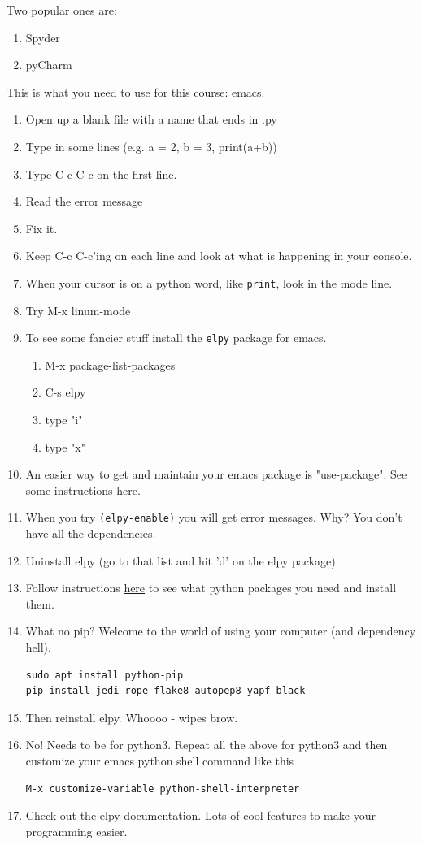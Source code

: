 \documentclass{article}
\begin{document}
Two popular ones are:
\begin{enumerate}
\item Spyder
\item pyCharm
\end{enumerate}

This is what you need to use for this course: emacs.
\begin{enumerate}
\item Open up a blank file with a name that ends in .py
\item Type in some lines (e.g. a = 2, b = 3, print(a+b))
\item Type C-c C-c on the first line.
\item Read the error message
\item Fix it.
\item Keep C-c C-c'ing on each line and look at what is happening in your console.
\item When your cursor is on a python word, like \texttt{print}, look in the mode line.
\item Try M-x linum-mode
\item To see some fancier stuff install the \texttt{elpy} package for emacs.
\begin{enumerate}
\item M-x package-list-packages
\item C-s elpy
\item type "i"
\item type "x"
\end{enumerate}
\item An easier way to get and maintain your emacs package is "use-package". See some instructions \href{https://elpy.readthedocs.io/en/latest/introduction.html\#overview}{here}.
\item When you try \texttt{(elpy-enable)} you will get error messages. Why? You don't have all the dependencies.
\item Uninstall elpy (go to that list and hit 'd' on the elpy package).
\item Follow instructions \href{https://github.com/jorgenschaefer/elpy}{here} to see what python packages you need and install them.
\item What no pip? Welcome to the world of using your computer (and dependency hell). 
\begin{verbatim}
sudo apt install python-pip
pip install jedi rope flake8 autopep8 yapf black
\end{verbatim}
\item Then reinstall elpy. Whoooo - wipes brow.
\item No! Needs to be for python3. Repeat all the above for python3 and then customize your emacs python shell command like this
\begin{verbatim}
M-x customize-variable python-shell-interpreter
\end{verbatim}
\item Check out the elpy \href{https://elpy.readthedocs.io/en/latest/introduction.html\#overview}{documentation}. Lots of cool features to make your programming easier.
\end{enumerate}
\end{document}
